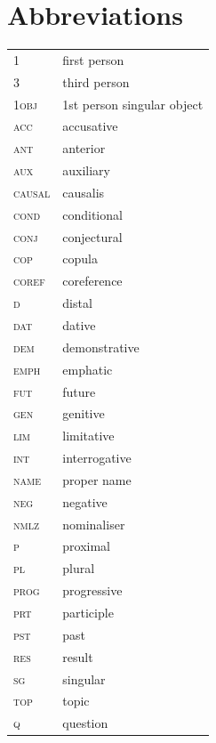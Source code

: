 \documentclass[output=paper]{langscibook}
\begin{document}
\section*{Abbreviations}
\begin{tabularx}{.45\textwidth}{lL{4cm}}
\textsc{1} & first person\\ 
\textsc{3} & third person\\ 
\textsc{1obj} & 1st person singular object\\
\textsc{acc} & accusative\\ 
\textsc{ant} &anterior\\  
\textsc{aux} & auxiliary\\  
\textsc{causal} & causalis\\ 
\textsc{cond} & conditional\\  
\textsc{conj} & conjectural\\ 
\textsc{cop} & copula\\ 
\textsc{coref} & coreference\\ 
\textsc{d} & distal\\ 
\textsc{dat} & dative\\ 
\textsc{dem} & demonstrative\\  
\textsc{emph} & emphatic\\ 
\textsc{fut} & future\\ 
\textsc{gen} & genitive\\  
\textsc{lim} & limitative\\ 
\textsc{int} & interrogative\\ 
\textsc{name} & proper name\\ 
\textsc{neg} & negative\\ 
\textsc{nmlz} & nominaliser\\ 
\textsc{p} & proximal\\ 
\textsc{pl} & plural\\ 
\textsc{prog} & progressive\\ 
\textsc{prt} & participle\\ 
\textsc{pst} & past\\ 
\textsc{res} & result\\  
\textsc{sg} & singular\\ 
\textsc{top} & topic\\  
\textsc{q} & question\\
\end{tabularx}


\sloppy
\printbibliography[heading=subbibliography,notkeyword=this]
\end{document}
